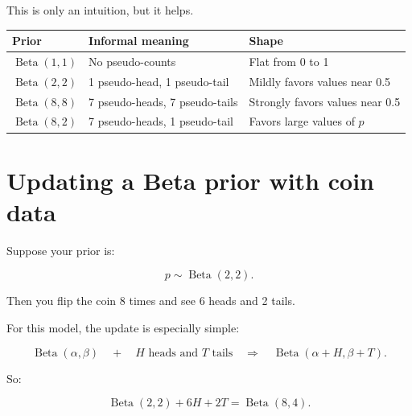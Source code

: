 \documentclass[11pt]{article}
\begin{document}
This is only an intuition, but it helps.

\begin{center}
\begin{tabular}{lll}
\toprule
Prior & Informal meaning & Shape \\
\midrule
$\operatorname{Beta}(1,1)$ & No pseudo-counts & Flat from 0 to 1 \\
$\operatorname{Beta}(2,2)$ & 1 pseudo-head, 1 pseudo-tail & Mildly favors values near 0.5 \\
$\operatorname{Beta}(8,8)$ & 7 pseudo-heads, 7 pseudo-tails & Strongly favors values near 0.5 \\
$\operatorname{Beta}(8,2)$ & 7 pseudo-heads, 1 pseudo-tail & Favors large values of $p$ \\
\bottomrule
\end{tabular}
\end{center}

\section{Updating a Beta prior with coin data}

Suppose your prior is:

\[
p \sim \operatorname{Beta}(2,2).
\]

Then you flip the coin 8 times and see 6 heads and 2 tails.

For this model, the update is especially simple:

\begin{equation}
\boxed{\displaystyle
\operatorname{Beta}(\alpha,\beta) \quad + \quad H \text{ heads and } T \text{ tails}
\quad \Longrightarrow \quad
\operatorname{Beta}(\alpha+H,\beta+T).
}
\end{equation}

So:

\[
\operatorname{Beta}(2,2)+6H+2T = \operatorname{Beta}(8,4).
\]

\begin{center}
\end{center}
\end{document}
